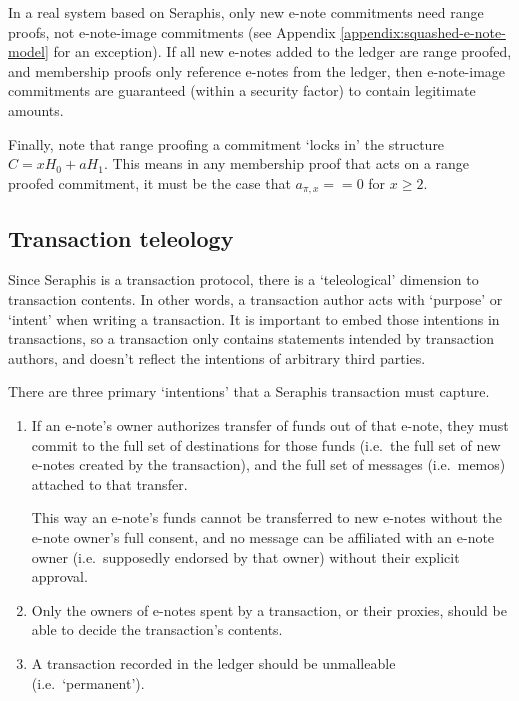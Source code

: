 In a real system based on Seraphis, only new e-note commitments need range proofs, not e-note-image commitments (see Appendix \ref{appendix:squashed-e-note-model} for an exception). If all new e-notes added to the ledger are range proofed, and membership proofs only reference e-notes from the ledger, then e-note-image commitments are guaranteed (within a security factor) to contain legitimate amounts.

Finally, note that range proofing a commitment `locks in' the structure $C = x H_0 + a H_1$. This means in any membership proof that acts on a range proofed commitment, it must be the case that $a_{\pi,x} == 0$ for $x \geq 2$.


\subsection{Transaction teleology}
\label{subsec:seraphis-tx-teleology}

Since Seraphis is a transaction protocol, there is a `teleological' dimension to transaction contents. In other words, a transaction author acts with `purpose' or `intent' when writing a transaction. It is important to embed those intentions in transactions, so a transaction only contains statements intended by transaction authors, and doesn't reflect the intentions of arbitrary third parties.

There are three primary `intentions' that a Seraphis transaction must capture.

\begin{enumerate}
    \item If an e-note's owner authorizes transfer of funds out of that e-note, they must commit to the full set of destinations for those funds (i.e.\ the full set of new e-notes created by the transaction), and the full set of messages (i.e.\ memos) attached to that transfer.

    This way an e-note's funds cannot be transferred to new e-notes without the e-note owner's full consent, and no message can be affiliated with an e-note owner (i.e.\ supposedly endorsed by that owner) without their explicit approval.

    \item Only the owners of e-notes spent by a transaction, or their proxies, should be able to decide the transaction's contents.

    \item A transaction recorded in the ledger should be unmalleable (i.e.\ `permanent').
\end{enumerate}

